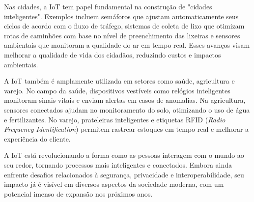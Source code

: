 Nas cidades, a IoT tem papel fundamental na construção de "cidades inteligentes". Exemplos incluem semáforos que ajustam automaticamente seus ciclos de acordo com o fluxo de tráfego, sistemas de coleta de lixo que otimizam rotas de caminhões com base no nível de preenchimento das lixeiras e sensores ambientais que monitoram a qualidade do ar em tempo real. Esses avanços visam melhorar a qualidade de vida dos cidadãos, reduzindo custos e impactos ambientais.

A IoT também é amplamente utilizada em setores como saúde, agricultura e varejo. No campo da saúde, dispositivos vestíveis como relógios inteligentes monitoram sinais vitais e enviam alertas em casos de anomalias. Na agricultura, sensores conectados ajudam no monitoramento do solo, otimizando o uso de água e fertilizantes. No varejo, prateleiras inteligentes e etiquetas RFID (\textit{Radio Frequency Identification}) permitem rastrear estoques em tempo real e melhorar a experiência do cliente.

A IoT está revolucionando a forma como as pessoas interagem com o mundo ao seu redor, tornando processos mais inteligentes e conectados. Embora ainda enfrente desafios relacionados à segurança, privacidade e interoperabilidade, seu impacto já é visível em diversos aspectos da sociedade moderna, com um potencial imenso de expansão nos próximos anos.



